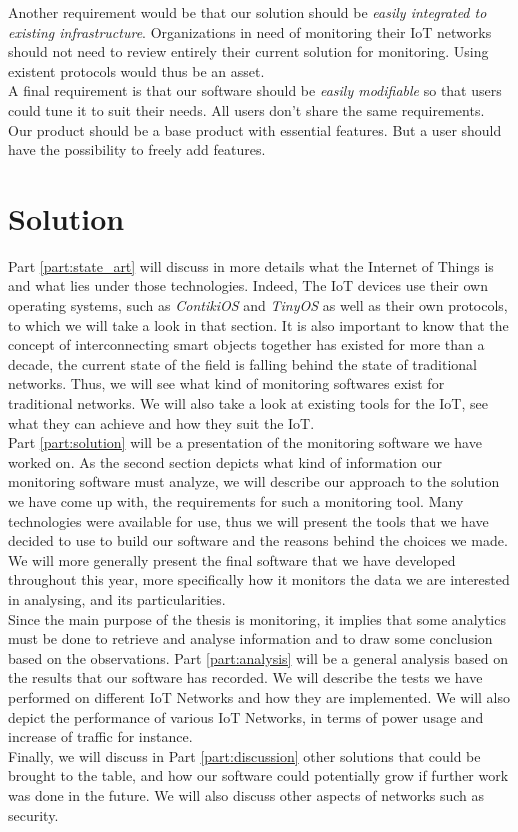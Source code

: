 Another requirement would be that our solution should be \textit{easily integrated to existing infrastructure}. Organizations in need of monitoring their IoT networks should not need to review entirely their current solution for monitoring. Using existent protocols would thus be an asset. \\

A final requirement is that our software should be \textit{easily modifiable} so that users could tune it to suit their needs. All users don't share the same requirements. Our product should be a base product with essential features. But a user should have the possibility to freely add features.

\section*{Solution}

Part \ref{part:state_art} will discuss in more details what the Internet of Things is and what lies under those technologies. Indeed, The IoT devices use their own operating systems, such as \textit{ContikiOS} and \textit{TinyOS} as well as their own protocols, to which we will take a look in that section. It is also important to know that the concept of interconnecting smart objects together has existed for more than a decade, the current state of the field is falling behind the state of traditional networks. Thus, we will see what kind of monitoring softwares exist for traditional networks. We will also take a look at existing tools for the IoT, see what they can achieve and how they suit the IoT.\\

Part \ref{part:solution} will be a presentation of the monitoring software we have worked on. As the second section depicts what kind of information our monitoring software must analyze, we will describe our approach to the solution we have come up with, the requirements for such a monitoring tool. Many technologies were available for use, thus we will present the tools that we have decided to use to build our software and the reasons behind the choices we made. We will more generally present the final software that we have developed throughout this year, more specifically how it monitors the data we are interested in analysing, and its particularities. \\

Since the main purpose of the thesis is monitoring, it implies that some analytics must be done to retrieve and analyse information and to draw some conclusion based on the observations. Part \ref{part:analysis} will be a general analysis based on the results that our software has recorded. We will describe the tests we have performed on different IoT Networks and how they are implemented. We will also depict the performance of various IoT Networks, in terms of power usage and increase of traffic for instance.\\

Finally, we will discuss in Part \ref{part:discussion} other solutions that could be brought to the table, and how our software could potentially grow if further work was done in the future. We will also discuss other aspects of networks such as security.
